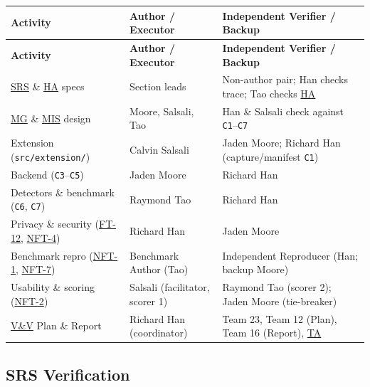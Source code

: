 \documentclass[12pt, titlepage]{article}
\newcommand{\HA}{\hyperlink{vnv-acr-ha}{HA}}
\newcommand{\MG}{\hyperlink{vnv-acr-mg}{MG}}
\newcommand{\MIS}{\hyperlink{vnv-acr-mis}{MIS}}
\newcommand{\SRS}{\hyperlink{vnv-acr-srs}{SRS}}
\newcommand{\TA}{\hyperlink{vnv-acr-ta}{TA}}
\newcommand{\VnV}{\hyperlink{vnv-acr-vnv}{V\&V}}
\begin{document}
\begingroup\small
\renewcommand{\arraystretch}{0.95}
\setlength{\tabcolsep}{4pt}
\begin{tabularx}{\textwidth}{P{4.9cm} P{3.6cm} Y}
\caption[V\&V Activity Assignment Matrix]{V\&V Activity Assignment Matrix (Role Switching)} \label{TblActivityMatrix}\\
\toprule
\textbf{Activity} & \textbf{Author / Executor} & \textbf{Independent Verifier / Backup}\\
\midrule
\endfirsthead
\toprule
\textbf{Activity} & \textbf{Author / Executor} & \textbf{Independent Verifier / Backup}\\
\midrule
\endhead
\bottomrule
\endfoot
\SRS{} \& \HA{} specs & Section leads & Non-author pair; Han checks trace; Tao checks \HA{}\\
\MG{} \& \MIS{} design & Moore, Salsali, Tao & Han \& Salsali check against \texttt{C1}--\texttt{C7}\\
Extension (\texttt{src/\allowbreak{}extension/}) & Calvin Salsali & Jaden Moore; Richard Han (capture/manifest \texttt{C1})\\
Backend (\texttt{C3}--\texttt{C5}) & Jaden Moore & Richard Han\\
Detectors \& benchmark (\texttt{C6}, \texttt{C7}) & Raymond Tao & Richard Han\\
Privacy \& security (\hyperref[test:FT-12]{FT-12}, \hyperref[test:NFT-4]{NFT-4}) & Richard Han & Jaden Moore\\
Benchmark repro (\hyperref[test:NFT-1]{NFT-1}, \hyperref[test:NFT-7]{NFT-7}) & Benchmark Author (Tao) & Independent Reproducer (Han; backup Moore)\\
Usability \& scoring (\hyperref[test:NFT-2]{NFT-2}) & Salsali (facilitator, scorer 1) & Raymond Tao (scorer 2); Jaden Moore (tie-breaker)\\
\VnV{} Plan \& Report & Richard Han (coordinator) & Team 23, Team 12 (Plan), Team 16 (Report), \TA{}\\
\end{tabularx}
\endgroup

\subsection{SRS Verification}\label{subsec:srs-verif}
\end{document}
